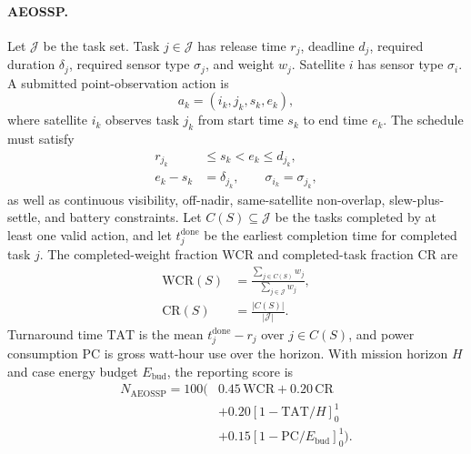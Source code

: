 \documentclass[11pt]{article}
\begin{document}
\paragraph{AEOSSP.} Let \(\mathcal{J}\) be the task set. Task \(j\in\mathcal{J}\) has release time \(r_j\), deadline \(d_j\), required duration \(\delta_j\), required sensor type \(\sigma_j\), and weight \(w_j\). Satellite \(i\) has sensor type \(\sigma_i\). A submitted point-observation action is
\[
  a_k=(i_k,j_k,s_k,e_k),
\]
where satellite \(i_k\) observes task \(j_k\) from start time \(s_k\) to end time \(e_k\). The schedule must satisfy
\[
  \begin{aligned}
  r_{j_k}&\le s_k<e_k\le d_{j_k},\\
  e_k-s_k&=\delta_{j_k},\qquad \sigma_{i_k}=\sigma_{j_k},
  \end{aligned}
\]
as well as continuous visibility, off-nadir, same-satellite non-overlap, slew-plus-settle, and battery constraints. Let \(C(S)\subseteq\mathcal{J}\) be the tasks completed by at least one valid action, and let \(t^{\mathrm{done}}_j\) be the earliest completion time for completed task \(j\). The completed-weight fraction \(\mathrm{WCR}\) and completed-task fraction \(\mathrm{CR}\) are
\[
  \begin{aligned}
  \mathrm{WCR}(S)&=\frac{\sum_{j\in C(S)}w_j}{\sum_{j\in\mathcal{J}} w_j},\\
  \mathrm{CR}(S)&=\frac{|C(S)|}{|\mathcal{J}|}.
  \end{aligned}
\]
Turnaround time \(\mathrm{TAT}\) is the mean \(t^{\mathrm{done}}_j-r_j\) over \(j\in C(S)\), and power consumption \(\mathrm{PC}\) is gross watt-hour use over the horizon. With mission horizon \(H\) and case energy budget \(E_{\mathrm{bud}}\), the reporting score is
\[
  \begin{aligned}
  N_{\mathrm{AEOSSP}}=100(&0.45\,\mathrm{WCR}+0.20\,\mathrm{CR}\\
  &+0.20[1-\mathrm{TAT}/H]_0^1\\
  &+0.15[1-\mathrm{PC}/E_{\mathrm{bud}}]_0^1).
  \end{aligned}
\]
\end{document}
